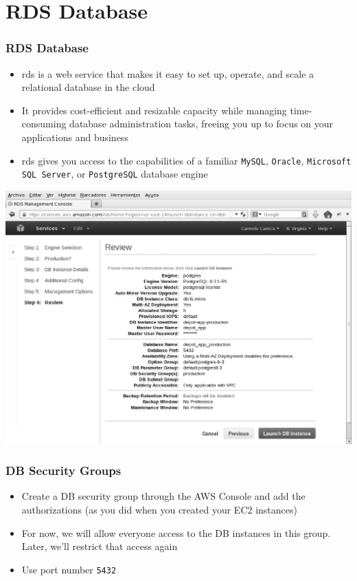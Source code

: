 \documentclass{beamer}
\begin{document}
\section{RDS Database}
\begin{frame}
\frametitle{RDS Database}
\begin{itemize}
 \item \acrfull{rds} is a web service that makes it easy to set up, operate, and scale a relational database in the cloud
 \item It provides cost-efficient and resizable capacity while managing time-consuming database administration tasks, freeing you up to focus on your applications and business
 \item \acrshort{rds} gives you access to the capabilities of a familiar \texttt{MySQL}, \texttt{Oracle}, \texttt{Microsoft SQL Server}, or \texttt{PostgreSQL} database engine
\end{itemize}
\begin{center}

\includegraphics[scale=0.25]{rds.eps}
\end{center}
\end{frame}
\begin{frame}
\frametitle{DB Security Groups}
\begin{itemize}
\item Create a DB security group through the AWS Console and add the authorizations (as you did when you created your EC2 instances)
\item For now, we will allow everyone access to the DB instances in this group. Later, we’ll restrict that access again
\item Use port number \texttt{5432}
\end{itemize}

\end{frame}
\end{document}
